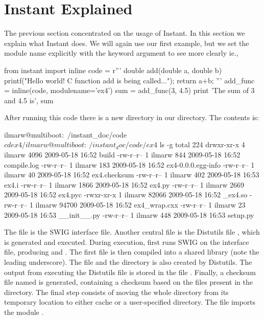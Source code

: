 \section{Instant Explained}
\label{wilbers:sec:explained}

The previous section concentrated on the usage of Instant.
In this section we explain what Instant does.
We will again use our first example, but we set the module name explicitly with the 
keyword argument  to see more clearly ie., 
\begin{python}
from instant import inline
code = r'''
double add(double a, double b)
{
  printf("Hello world! C function add is being called...\n");
  return a+b;
}'''
add_func = inline(code, modulename='ex4')
sum = add_func(3, 4.5)
print 'The sum of 3 and 4.5 is', sum
\end{python}
After running this code there is a new directory  in our directory.   
The contents is: 
\begin{python}
ilmarw@multiboot:~/instant_doc/code$ cd ex4/
ilmarw@multiboot:~/instant_doc/code/ex4$ ls -g
total 224
drwxr-xr-x 4 ilmarw  4096 2009-05-18 16:52 build
-rw-r--r-- 1 ilmarw   844 2009-05-18 16:52 compile.log
-rw-r--r-- 1 ilmarw   183 2009-05-18 16:52 ex4-0.0.0.egg-info
-rw-r--r-- 1 ilmarw    40 2009-05-18 16:52 ex4.checksum
-rw-r--r-- 1 ilmarw   402 2009-05-18 16:53 ex4.i
-rw-r--r-- 1 ilmarw  1866 2009-05-18 16:52 ex4.py
-rw-r--r-- 1 ilmarw  2669 2009-05-18 16:52 ex4.pyc
-rwxr-xr-x 1 ilmarw 82066 2009-05-18 16:52 _ex4.so
-rw-r--r-- 1 ilmarw 94700 2009-05-18 16:52 ex4_wrap.cxx
-rw-r--r-- 1 ilmarw    23 2009-05-18 16:53 __init__.py
-rw-r--r-- 1 ilmarw   448 2009-05-18 16:53 setup.py
\end{python}
The file  is the SWIG interface file. 
Another central file is the Distutils file , which is generated 
and executed. During execution,  first runs SWIG on the interface file,
producing  and . The first file
is then compiled into a shared library  
(note the leading underscore). The file 
and the directory  is also created by Distutils.  
The output from executing the Distutils file is stored in the file
.  Finally, a checksum file named
 is generated, containing a checksum based on
the files present in the directory. The final step consists of moving the whole
directory from its temporary location to either cache or a user-specified
directory. The file  imports the module .

